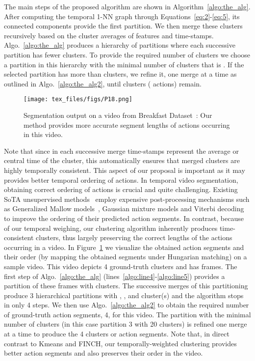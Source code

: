 \documentclass[10pt,twocolumn,letterpaper]{article}
\begin{document}
The main steps of the proposed algorithm are shown in Algorithm~\ref{algo:the_alg}. After computing the temporal 1-NN graph through Equations~\ref{eq:2}-\ref{eq:5}, its connected components provide the first partition. We then merge these clusters recursively based on the cluster averages of features and time-stamps. Algo.~\ref{algo:the_alg} produces a hierarchy of partitions where each successive partition has fewer clusters.
To provide the required number of clusters  we choose a partition in this hierarchy with the minimal number of clusters that is . If the selected partition has more than  clusters, we refine it, one merge at a time as outlined in Algo.~\ref{algo:the_alg2}, until  clusters ( actions) remain.

\begin{figure}
    \centering
    \texttt{[image: tex\_files/figs/P18.png]}
\caption{Segmentation output on a video from Breakfast Dataset~\cite{ute_15}: Our method provides more accurate segment lengths of actions occurring in this video.\label{fig:vis_method}}
    \vspace{-0.3cm}
\end{figure}

Note that since in each successive merge time-stamps represent the average or central time of the cluster, this automatically ensures that merged clusters are highly temporally consistent. This aspect of our proposal is important as it may provides better temporal ordering of actions. In temporal video segmentation, obtaining correct ordering of actions is crucial and quite challenging. Existing SoTA unsupervised methods~\cite{ute_paper, mallow, nnv} employ expensive post-processing mechanisms such as Generalized Mallow models~\cite{mallows1957non}, Gaussian mixture models and Viterbi decoding to improve the ordering of their predicted action segments. In contrast, because of our temporal weighing, our clustering algorithm inherently produces time-consistent clusters, thus largely preserving the correct lengths of the actions occurring in a video. In Figure~\ref{fig:vis_method} we visualize the obtained action segments and their order (by mapping the obtained segments under  Hungarian matching) on a sample video. This video depicts 4 ground-truth clusters and has  frames. The first step of Algo.~\ref{algo:the_alg} (lines~\ref{algo:line4}-\ref{algo:line5}) provides a partition of these  frames with  clusters. The successive merges of this partitioning produce 3 hierarchical partitions with , ,  and  cluster(s) and the algorithm stops in only 4 steps. 
We then use Algo.~\ref{algo:the_alg2} to obtain the required number of ground-truth action segments, 4, for this video. 
The partition with the minimal number of clusters  (in this case partition 3 with 20 clusters) is refined one merge at a time to produce the 4 clusters or action segments. Note that, in direct contrast to Kmeans and FINCH, our temporally-weighted clustering provides better action segments and also preserves their order in the video. 
\end{document}
